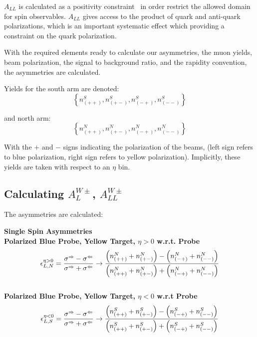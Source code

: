 $A_{LL}$ is calculated as a positivity constraint~\cite{Kang2011} in order
restrict the allowed domain for spin observables. $A_{LL}$ gives access to the
product of quark and anti-quark polarizations, which is an important systematic
effect which providing a constraint on the quark polarization.

With the required elements ready to calculate our asymmetries, the muon yields,
beam polarization, the signal to background ratio, and the rapidity convention,
the asymmetries are calculated. 

{\noindent}Yields for the south arm are denoted:
\begin{equation}
  \left\{
  n_{\left(++\right)}^S,
  n_{\left(+-\right)}^S,
  n_{\left(-+\right)}^S,
  n_{\left(--\right)}^S
  \right\}
  \label{eq:muon_yield_south}
\end{equation}

{\noindent}and north arm:
\begin{equation}
  \left\{
  n_{\left(++\right)}^N,
  n_{\left(+-\right)}^N,
  n_{\left(-+\right)}^N,
  n_{\left(--\right)}^N
  \right\}
  \label{eq:muon_yield_north}
\end{equation}

With the $+$ and $-$ signs indicating the polarization of the beams, (left sign
refers to blue polarization, right sign refers to yellow polarization).
Implicitly, these yields are taken with respect to an $\eta$ bin.

\subsection{Calculating $A_L^{W\pm}$, $A_{LL}^{W\pm}$}

The asymmetries are calculated:

\noindent\textbf{Single Spin Asymmetries}\\

\noindent\textbf{Polarized Blue Probe, Yellow Target, $\eta > 0$ w.r.t. Probe}
\begin{equation}
  {\epsilon_{L,N}^{\eta > 0}} 
  = 
  { 
    {\sigma^\Rightarrow-\sigma^\Leftarrow} 
    \over 
    {\sigma^\Rightarrow+\sigma^\Leftarrow} 
  } 
  \to 
  {
    {\left(n_{(++)}^N+n_{(+-)}^N\right)-\left(n_{(-+)}^N+n_{(--)}^N\right)}
    \over
    {\left(n_{(++)}^N+n_{(+-)}^N\right)+\left(n_{(-+)}^N+n_{(--)}^N\right)}
  }
  \label{eq:al_blue_probe_pos_rap}
\end{equation}\\

\noindent\textbf{Polarized Blue Probe, Yellow Target, $\eta < 0$ w.r.t Probe}
\begin{equation}
  {\epsilon_{L,S}^{\eta < 0}} 
  = 
  { 
    {\sigma^\Rightarrow - \sigma^\Leftarrow} 
    \over 
    {\sigma^\Rightarrow + \sigma^\Leftarrow} 
  } 
  \to 
  {
    {\left(n_{(++)}^S+n_{(+-)}^S\right)-\left(n_{(-+)}^S+n_{(--)}^S\right)}
    \over
    {\left(n_{(++)}^S+n_{(+-)}^S\right)+\left(n_{(-+)}^S+n_{(--)}^S\right)}
  }
  \label{eq:al_blue_probe_neg_rap}
\end{equation}\\

